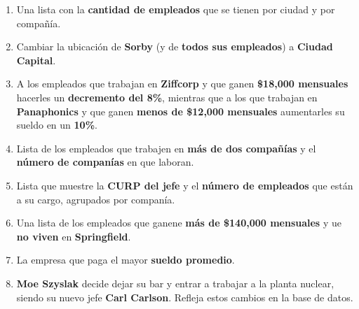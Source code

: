 \documentclass{article}
\begin{document}
\begin{enumerate}
{{\begin{enumerate}
{\begin{align*}
                        \end{align*}
                    }
                    \item {
                        Una lista con la \textbf{cantidad de empleados} que se
                        tienen por ciudad y por compañía.
                    }
                    \item {
                        Cambiar la ubicación de \textbf{Sorby} (y de 
                        \textbf{todos sus empleados}) a \textbf{Ciudad Capital}.
                    }
                    \item {
                        A los empleados que trabajan en \textbf{Ziffcorp} y que
                        ganen \textbf{\$18,000 mensuales} hacerles un
                        \textbf{decremento del 8\%}, mientras que a los que
                        trabajan en \textbf{Panaphonics} y que ganen 
                        \textbf{menos de \$12,000 mensuales} aumentarles su
                        sueldo en un \textbf{10\%}.
                    }
                    \item {
                        Lista de los empleados que trabajen en \textbf{más de
                        dos compañías} y el \textbf{número de companías} en que 
                        laboran.
                    }
                    \item {
                        Lista que muestre la \textbf{CURP del jefe} y el
                        \textbf{número de empleados} que están a su cargo,
                        agrupados por companía.
                    }
                    \item {
                        Una lista de los empleados que ganene \textbf{más de 
                        \$140,000 mensuales} y ue \textbf{no viven} en
                        \textbf{Springfield}.
                    }
                    \item {
                        La empresa que paga el mayor \textbf{sueldo promedio}.
                    }
                    \item {
                        \textbf{Moe Szyslak} decide dejar su bar y entrar a
                        trabajar a la planta nuclear, siendo su nuevo jefe
                        \textbf{Carl Carlson}. Refleja estos cambios en la base
                        de datos.
                    }
                \end{enumerate}
            }
        }
    \end{enumerate}
\end{document}
